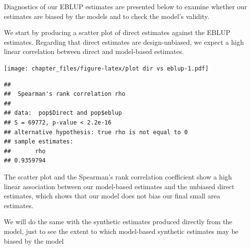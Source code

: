 \documentclass[
]{article}
\newenvironment{Shaded}{\begin{snugshade}}{\end{snugshade}}
\newcommand{\CommentTok}[1]{\textcolor[rgb]{0.56,0.35,0.01}{\textit{#1}}}
\newcommand{\DataTypeTok}[1]{\textcolor[rgb]{0.13,0.29,0.53}{#1}}
\newcommand{\KeywordTok}[1]{\textcolor[rgb]{0.13,0.29,0.53}{\textbf{#1}}}
\newcommand{\NormalTok}[1]{#1}
\newcommand{\OperatorTok}[1]{\textcolor[rgb]{0.81,0.36,0.00}{\textbf{#1}}}
\newcommand{\StringTok}[1]{\textcolor[rgb]{0.31,0.60,0.02}{#1}}
\begin{document}
Diagnostics of our EBLUP estimates are presented below to examine
whether our estimates are biased by the models and to check the model's
validity.

We start by producing a scatter plot of direct estimates against the
EBLUP estimates. Regarding that direct estimates are design-unbiased, we
expect a high linear correlation between direct and model-based
estimates.

\begin{Shaded}
\end{Shaded}

\texttt{[image: chapter\_files/figure-latex/plot dir vs eblup-1.pdf]}

\begin{Shaded}
\end{Shaded}

\begin{verbatim}
## 
##  Spearman's rank correlation rho
## 
## data:  pop$Direct and pop$eblup
## S = 69772, p-value < 2.2e-16
## alternative hypothesis: true rho is not equal to 0
## sample estimates:
##       rho 
## 0.9359794
\end{verbatim}

The scatter plot and the Spearman's rank correlation coefficient show a
high linear association between our model-based estimates and the
unbiased direct estimates, which shows that our model does not bias our
final small area estimates.

We will do the same with the synthetic estimates produced directly from
the model, just to see the extent to which model-based synthetic
estimates may be biased by the model

\begin{Shaded}
\end{Shaded}
\end{document}
